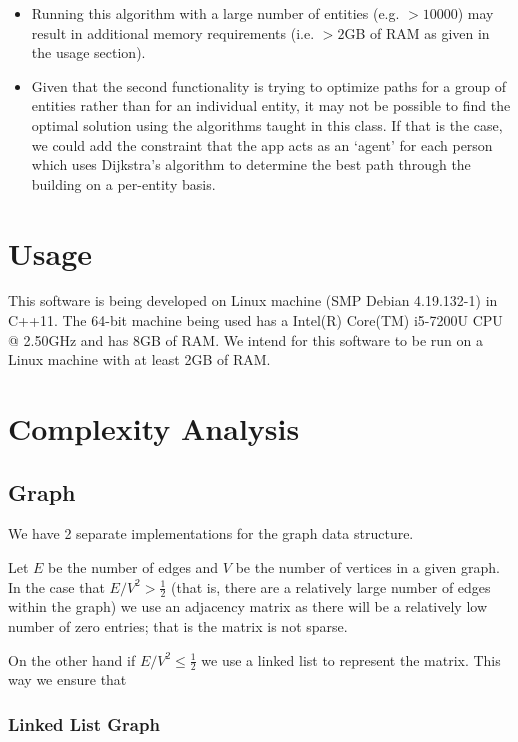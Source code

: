 \documentclass{article}
\begin{document}
\begin{itemize}[noitemsep]
    \item Running this algorithm with a large number of entities (e.g. $>10000$) may result in additional memory requirements (i.e. $>2$GB of RAM as given in the usage section).
    \item {
        Given that the second functionality is trying to optimize paths for a group of entities rather than for an individual entity, it may not be possible to find the optimal solution using the algorithms taught in this class. If that is the case, we could add the constraint that the app acts as an `agent' for each person which uses Dijkstra's algorithm to determine the best path through the building on a per-entity basis.
    }
\end{itemize}

\section{Usage}
This software is being developed on Linux machine (SMP Debian 4.19.132-1) in C++11. The 64-bit machine being used has a Intel(R) Core(TM) i5-7200U CPU @ 2.50GHz and has 8GB of RAM. We intend for this software to be run on a Linux machine with at least 2GB of RAM.


\section{Complexity Analysis}

\subsection{Graph}

We have 2 separate implementations for the graph data structure. 

Let $E$ be the number of edges and $V$ be the number of vertices in a given graph. In the case that $E/V^2 > \frac{1}{2}$ (that is, there are a relatively large number of edges within the graph) we use an adjacency matrix as there will be a relatively low number of zero entries; that is the matrix is not sparse.

On the other hand if $E/V^2 \leq \frac{1}{2}$ we use a linked list to represent the matrix. This way we ensure that 

\subsubsection{Linked List Graph}
\end{document}

